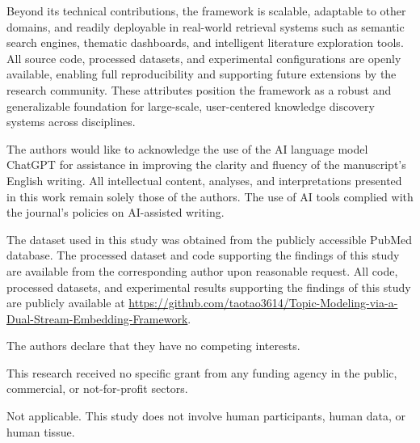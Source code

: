 \documentclass[authorproof,JACIII,researchpaper]{fujipressarticle}
\begin{document}
Beyond its technical contributions, the framework is scalable, adaptable to other domains, and readily deployable in real-world retrieval systems such as semantic search engines, thematic dashboards, and intelligent literature exploration tools. All source code, processed datasets, and experimental configurations are openly available, enabling full reproducibility and supporting future extensions by the research community. These attributes position the framework as a robust and generalizable foundation for large-scale, user-centered knowledge discovery systems across disciplines.

\acknowledgments
The authors would like to acknowledge the use of the AI language model ChatGPT for assistance in improving the clarity and fluency of the manuscript's English writing. All intellectual content, analyses, and interpretations presented in this work remain solely those of the authors. The use of AI tools complied with the journal's policies on AI-assisted writing.




The dataset used in this study was obtained from the publicly accessible PubMed database. The processed dataset and code supporting the findings of this study are available from the corresponding author upon reasonable request. All code, processed datasets, and experimental results supporting the findings of this study are publicly available at \url{https://github.com/taotao3614/Topic-Modeling-via-a-Dual-Stream-Embedding-Framework}.

The authors declare that they have no competing interests.

\acknowledgments[Funding]
This research received no specific grant from any funding agency in the public, commercial, or not-for-profit sectors.

Not applicable. This study does not involve human participants, human data, or human tissue.

\begin{profile}
	\Membership{}
\end{profile}
\end{document}
